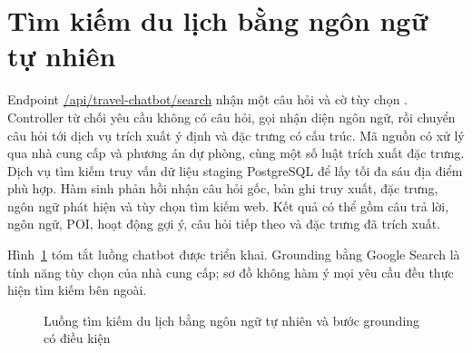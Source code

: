\section{Tìm kiếm du lịch bằng ngôn ngữ tự nhiên}

Endpoint \url{/api/travel-chatbot/search} nhận một câu hỏi và cờ tùy chọn . Controller từ chối yêu cầu không có câu hỏi, gọi nhận diện ngôn ngữ, rồi chuyển câu hỏi tới dịch vụ trích xuất ý định và đặc trưng có cấu trúc. Mã nguồn có xử lý qua nhà cung cấp và phương án dự phòng, cùng một số luật trích xuất đặc trưng. Dịch vụ tìm kiếm truy vấn dữ liệu staging PostgreSQL để lấy tối đa sáu địa điểm phù hợp. Hàm sinh phản hồi nhận câu hỏi gốc, bản ghi truy xuất, đặc trưng, ngôn ngữ phát hiện và tùy chọn tìm kiếm web. Kết quả có thể gồm câu trả lời, ngôn ngữ, POI, hoạt động gợi ý, câu hỏi tiếp theo và đặc trưng đã trích xuất.

Hình~\ref{fig:chat_search_pipeline} tóm tắt luồng chatbot được triển khai. Grounding bằng Google Search là tính năng tùy chọn của nhà cung cấp; sơ đồ không hàm ý mọi yêu cầu đều thực hiện tìm kiếm bên ngoài.

\begin{figure}[htbp]
    \centering
    \caption{Luồng tìm kiếm du lịch bằng ngôn ngữ tự nhiên và bước grounding có điều kiện}
    \label{fig:chat_search_pipeline}
\end{figure}

